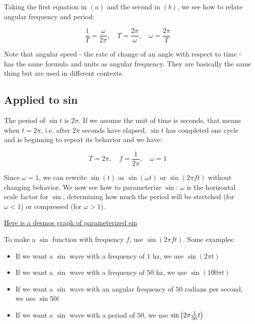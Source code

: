 \documentclass{article}
\begin{document}
Taking the first equation in $(a)$ and the second in $(b)$, we see how to relate angular frequency and period:

\[ \tag{c} \frac{1}{T} = \frac{\omega}{2 \pi}, \quad T = \frac{2 \pi}{\omega}, \quad \omega = \frac{2 \pi}{T} \]

Note that angular speed - the rate of change of an angle with respect to time - has the same formula and units as angular frequency. They are basically the same thing but are used in different contexts.

\subsection{Applied to sin}

The period of $\sin{t}$ is $2 \pi$. If we assume the unit of time is seconds, that means when $t = 2 \pi$, i.e. after $2 \pi$ seconds have elapsed, $\sin{t}$ has completed one cycle and is beginning to repeat its behavior and we have:

\[ \tag{a} T = 2 \pi, \quad f = \frac{1}{2 \pi}, \quad \omega = 1 \]

Since $\omega = 1$, we can rewrite $\sin{(t)}$ as $\sin{(\omega t)}$ or $\sin{(2 \pi f t)}$ without changing behavior. We now see how to parameterize $\sin$: $\omega$ is the horizontal scale factor for $\sin$, determining how much the period will be stretched (for $\omega < 1$) or compressed (for $\omega > 1$).

\href{https://www.desmos.com/calculator/jzxw6vcm9d}{Here is a desmos graph of parameterized sin}

To make a $\sin$ function with frequency $f$, use $\sin{(2 \pi f t)}$. Some examples:

\begin{itemize}
\item If we want a $\sin$ wave with a frequency of $1$ hz, we use $\sin{(2 \pi t)}$
\item If we want a $\sin$ wave with a frequency of $50$ hz, we use $\sin{(100 \pi t)}$
\item If we want a $\sin$ wave with an angular frequency of $50$ radians per second, we use $\sin{50t}$
\item If we want a $\sin$ wave with a period of $50$, we use $\sin{\left(2 \pi \frac{1}{50} t\right)}$
\end{itemize}
\end{document}
